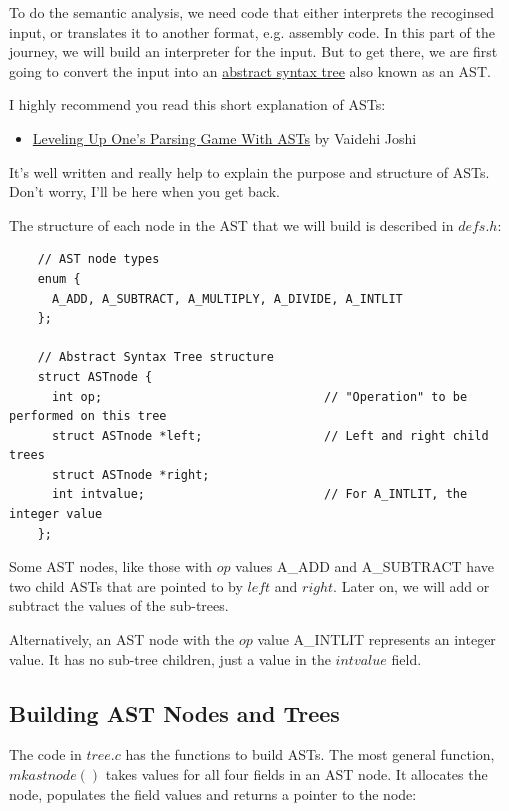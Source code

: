 \documentclass[a4paper,12pt]{article}
\begin{document}
To do the semantic analysis, we need code that either interprets the recoginsed input, or translates it to another format, e.g. assembly code. In this part of the journey, we will build an interpreter for the input. But to get there, we are first going to convert the input into an \href{https://en.wikipedia.org/wiki/Abstract_syntax_tree}{abstract syntax tree} also known as an AST.

I highly recommend you read this short explanation of ASTs:
\begin{itemize}
    \item \href{https://medium.com/basecs/leveling-up-ones-parsing-game-with-asts-d7a6fc2400ff}{Leveling Up One’s Parsing Game With ASTs} by Vaidehi Joshi
\end{itemize}

It's well written and really help to explain the purpose and structure of ASTs. Don't worry, I'll be here when you get back.

The structure of each node in the AST that we will build is described in $defs.h$:

\begin{lstlisting}
    // AST node types
    enum {
      A_ADD, A_SUBTRACT, A_MULTIPLY, A_DIVIDE, A_INTLIT
    };

    // Abstract Syntax Tree structure
    struct ASTnode {
      int op;                               // "Operation" to be performed on this tree
      struct ASTnode *left;                 // Left and right child trees
      struct ASTnode *right;
      int intvalue;                         // For A_INTLIT, the integer value
    };
\end{lstlisting}

Some AST nodes, like those with $op$ values A\_ADD and A\_SUBTRACT have two child ASTs that are pointed to by $left$ and $right$. Later on, we will add or subtract the values of the sub-trees.

Alternatively, an AST node with the $op$ value A\_INTLIT represents an integer value. It has no sub-tree children, just a value in the $intvalue$ field.

\subsection{Building AST Nodes and Trees}

The code in $tree.c$ has the functions to build ASTs. The most general function, $mkastnode()$ takes values for all four fields in an AST node. It allocates the node, populates the field values and returns a pointer to the node:
\end{document}
